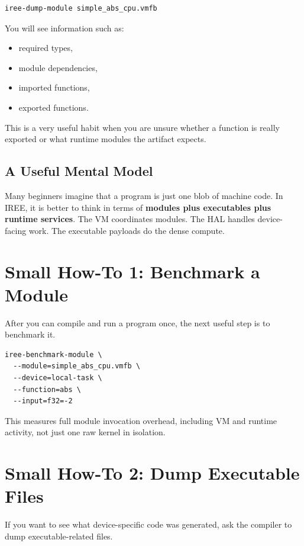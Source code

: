 \documentclass[11pt,a4paper]{article}
\begin{document}
\begin{lstlisting}[caption=Inspect a VMFB]
iree-dump-module simple_abs_cpu.vmfb
\end{lstlisting}

You will see information such as:
\begin{itemize}
    \item required types,
    \item module dependencies,
    \item imported functions,
    \item exported functions.
\end{itemize}

This is a very useful habit when you are unsure whether a function is really exported or what runtime modules the artifact expects.

\subsection{A Useful Mental Model}

Many beginners imagine that a program is just one blob of machine code. In IREE, it is better to think in terms of \textbf{modules plus executables plus runtime services}. The VM coordinates modules. The HAL handles device-facing work. The executable payloads do the dense compute.

\section{Small How-To 1: Benchmark a Module}

After you can compile and run a program once, the next useful step is to benchmark it.

\begin{lstlisting}[caption=Benchmark the same exported function]
iree-benchmark-module \
  --module=simple_abs_cpu.vmfb \
  --device=local-task \
  --function=abs \
  --input=f32=-2
\end{lstlisting}

This measures full module invocation overhead, including VM and runtime activity, not just one raw kernel in isolation.

\section{Small How-To 2: Dump Executable Files}

If you want to see what device-specific code was generated, ask the compiler to dump executable-related files.
\end{document}
